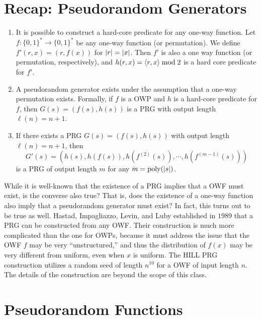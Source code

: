 \documentclass[11pt]{article}
\begin{document}
\thispagestyle{fancy}           %


\section{Recap: Pseudorandom Generators}
\label{sec:recap:-pseud-gener}

\begin{enumerate}
\item It is possible to construct a hard-core predicate for any
  one-way function.  Let $f: \{0,1\}^{*} \rightarrow \{0,1\}^{*}$ be
  any one-way function (or permutation).  We define $f'(r,x) =
  (r,f(x))$ for $\lvert r\rvert = \lvert x\rvert$.  Then $f'$ is also a one way
  function (or permutation, respectively), and $h(r,x) = \langle r,x\rangle
  \bmod 2$ is a hard core predicate for $f'$.
\item A pseudorandom generator exists under the assumption that a
  one-way permutation exists.  Formally, if $f$ is a OWP and $h$ is a
  hard-core predicate for $f$, then $G(s) = (f(s), h(s))$ is a PRG
  with output length $\ell(n) = n+1$.
\item If there exists a PRG $G(s) = (f(s), h(s))$ with output length
  $\ell(n) = n+1$, then
  \[G'(s) = (h(s), h(f(s)), h(f^{(2)}(s)), \cdots ,h(f^{(m-1)}(s))) \]
  is a PRG of output length $m$ for any $m = \operatorname{poly}(\lvert s\rvert)$.
\end{enumerate}

While it is well-known that the existence of a PRG implies that a OWF
must exist, is the converse also true?  That is, does the existence of
a one-way function also imply that a pseudorandom generator must
exist?  In fact, this turns out to be true as well.  Hastad,
Impagliazzo, Levin, and Luby established in $1989$ that a PRG can be
constructed from any OWF.  Their construction is much more complicated
than the one for OWPs, because it must address the issue that the OWF
$f$ may be very ``unstructured,'' and thus the distribution of $f(x)$
may be very different from uniform, even when $x$ is uniform.  The
HILL PRG construction utilizes a random seed of length $n^{10}$ for a
OWF of input length $n$.  The details of the construction are beyond
the scope of this class.

\section{Pseudorandom Functions}
\label{sec:pseud-funct}
\end{document}
